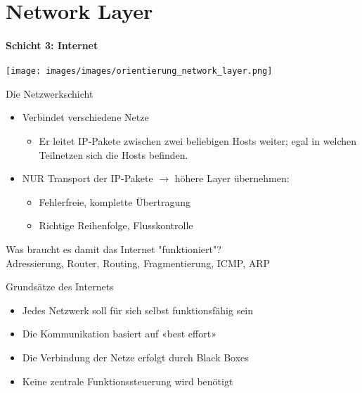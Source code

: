 \section{Network Layer}
\paragraph{Schicht 3: Internet}

\texttt{[image: images/images/orientierung\_network\_layer.png]}

\begin{definition}{Die Netzwerkschicht}
    \begin{itemize}
        \item Verbindet verschiedene Netze
        \begin{itemize}
            \item Er leitet IP-Pakete zwischen zwei beliebigen Hosts weiter; egal in welchen Teilnetzen sich die Hosts befinden.
        \end{itemize}
        \item NUR Transport der IP-Pakete $\rightarrow$ höhere Layer übernehmen:
        \begin{itemize}
            \item Fehlerfreie, komplette Übertragung
            \item Richtige Reihenfolge, Flusskontrolle
        \end{itemize}
    \end{itemize}
\end{definition}

\begin{concept}{Was braucht es damit das Internet "funktioniert"?}\\
    Adressierung, Router, Routing, Fragmentierung, ICMP, ARP
\end{concept}

\begin{lemma}{Grundsätze des Internets}
    \begin{itemize}
        \item Jedes Netzwerk soll für sich selbst funktionsfähig sein
        \item Die Kommunikation basiert auf «best effort»
        \item Die Verbindung der Netze erfolgt durch Black Boxes
        \item Keine zentrale Funktionssteuerung wird benötigt
    \end{itemize}
\end{lemma}

